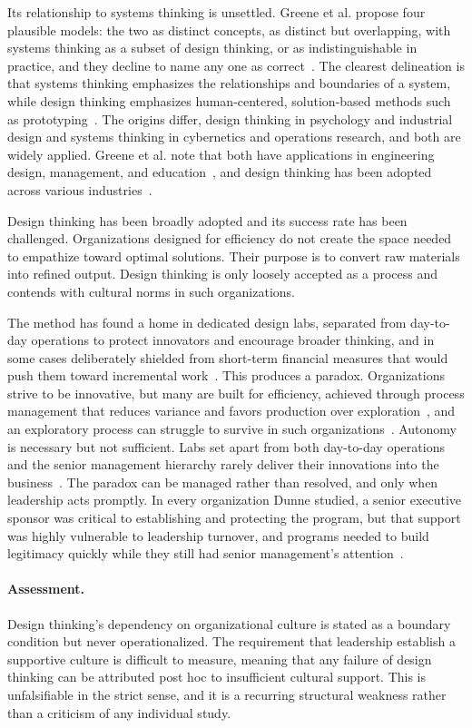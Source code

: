\documentclass{csimq}
\begin{document}
Its relationship to systems thinking is unsettled. Greene et al. propose four plausible models: the two as distinct concepts, as distinct but overlapping, with systems thinking as a subset of design thinking, or as indistinguishable in practice, and they decline to name any one as correct~\cite{greene2017}. The clearest delineation is that systems thinking emphasizes the relationships and boundaries of a system, while design thinking emphasizes human-centered, solution-based methods such as prototyping~\cite{greene2017}. The origins differ, design thinking in psychology and industrial design and systems thinking in cybernetics and operations research, and both are widely applied. Greene et al. note that both have applications in engineering design, management, and education~\cite{greene2017}, and design thinking has been adopted across various industries~\cite{dunne2018}.

Design thinking has been broadly adopted and its success rate has been
challenged. Organizations designed for efficiency do not create the space needed
to empathize toward optimal solutions. Their purpose is to convert raw materials
into refined output. Design thinking is only loosely accepted as a process and
contends with cultural norms in such organizations.

The method has found a home in dedicated design labs, separated from day-to-day operations to protect innovators and encourage broader thinking, and in some cases deliberately shielded from short-term financial measures that would push them toward incremental work~\cite{dunne2018}. This produces a paradox. Organizations strive to be innovative, but many are built for efficiency, achieved through process management that reduces variance and favors production over exploration~\cite{benner2003}, and an exploratory process can struggle to survive in such organizations~\cite{dunne2018}. Autonomy is necessary but not sufficient. Labs set apart from both day-to-day operations and the senior management hierarchy rarely deliver their innovations into the business~\cite{oreilly2004,dunne2018}. The paradox can be managed rather than resolved, and only when leadership acts promptly. In every organization Dunne studied, a senior executive sponsor was critical to establishing and protecting the program, but that support was highly vulnerable to leadership turnover, and programs needed to build legitimacy quickly while they still had senior management's attention~\cite{dunne2018}.

\paragraph{Assessment.} Design thinking's dependency on organizational culture
is stated as a boundary condition but never operationalized. The requirement
that leadership establish a supportive culture is difficult to measure, meaning
that any failure of design thinking can be attributed post hoc to insufficient
cultural support. This is unfalsifiable in the strict sense, and it is a
recurring structural weakness rather than a criticism of any individual study.
\end{document}

